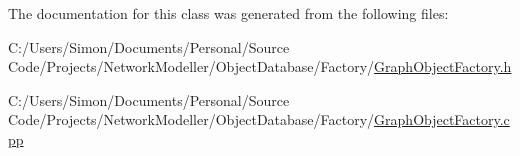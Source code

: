 The documentation for this class was generated from the following files\+:\begin{DoxyCompactItemize}
\item 
C\+:/\+Users/\+Simon/\+Documents/\+Personal/\+Source Code/\+Projects/\+Network\+Modeller/\+Object\+Database/\+Factory/\hyperlink{_graph_object_factory_8h}{Graph\+Object\+Factory.\+h}\item 
C\+:/\+Users/\+Simon/\+Documents/\+Personal/\+Source Code/\+Projects/\+Network\+Modeller/\+Object\+Database/\+Factory/\hyperlink{_graph_object_factory_8cpp}{Graph\+Object\+Factory.\+cpp}\end{DoxyCompactItemize}
